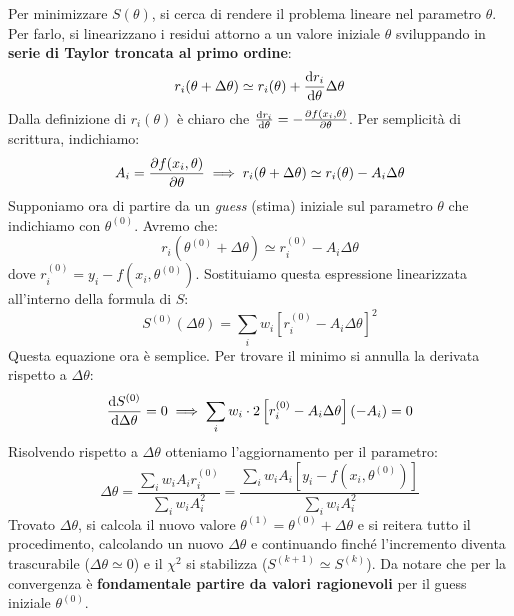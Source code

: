 \documentclass[openany,a4paper,12pt]{book}
\theoremstyle{remark}
\begin{document}
Per minimizzare $S(\theta)$, si cerca di rendere il problema lineare nel parametro $\theta$. Per farlo, si linearizzano i residui attorno a un valore iniziale $\theta$ sviluppando in \textbf{serie di Taylor troncata al primo ordine}:
\begin{equation*}
    r_i(\theta + \Delta\theta) \simeq r_i(\theta) + \derivative{r_i}{\theta}\Delta\theta 
\end{equation*}
Dalla definizione di $r_i(\theta)$ è chiaro che $\derivative{r_i}{\theta} = - \pderivative{f(x_i, \theta)}{\theta}$. Per semplicità di scrittura, indichiamo:
\begin{equation}
    A_i = \pderivative{f(x_i, \theta)}{\theta} \implies r_i(\theta + \Delta\theta) \simeq r_i(\theta) - A_i \Delta\theta
\end{equation}
Supponiamo ora di partire da un \textit{guess} (stima) iniziale sul parametro $\theta$ che indichiamo con $\theta^{(0)}$. Avremo che:
\begin{equation}
    r_i(\theta^{(0)} + \Delta\theta) \simeq r_i^{(0)} - A_i \Delta\theta
\end{equation}
dove $r_i^{(0)} = y_i - f(x_i, \theta^{(0)})$. Sostituiamo questa espressione linearizzata all'interno della formula di $S$:
\begin{equation}
    S^{(0)}(\Delta\theta) = \sum_{i} w_i \left[ r_i^{(0)} - A_i \Delta\theta \right]^2
\end{equation}
Questa equazione ora è semplice. Per trovare il minimo si annulla la derivata rispetto a $\Delta\theta$:
\begin{equation*}
    \derivative{S^{(0)}}{\Delta\theta} = 0 \implies \sum_{i} w_i \cdot 2 \left[ r_i^{(0)} - A_i \Delta\theta \right](-A_i) = 0
\end{equation*}
Risolvendo rispetto a $\Delta\theta$ otteniamo l'aggiornamento per il parametro:
\begin{equation}
    \Delta\theta = \frac{\sum_{i} w_i A_i r_i^{(0)}}{\sum_{i} w_i A_i^2} = \frac{\sum_{i} w_i A_i [y_i - f(x_i, \theta^{(0)})]}{\sum_{i} w_i A_i^2}
\end{equation}
Trovato $\Delta\theta$, si calcola il nuovo valore $\theta^{(1)} = \theta^{(0)} + \Delta\theta$ e si reitera tutto il procedimento, calcolando un nuovo $\Delta\theta$ e continuando finché l'incremento diventa trascurabile ($\Delta\theta \simeq 0$) e il $\chi^2$ si stabilizza ($S^{(k+1)} \simeq S^{(k)}$). Da notare che per la convergenza è \textbf{fondamentale partire da valori ragionevoli} per il guess iniziale $\theta^{(0)}$.
\end{document}
